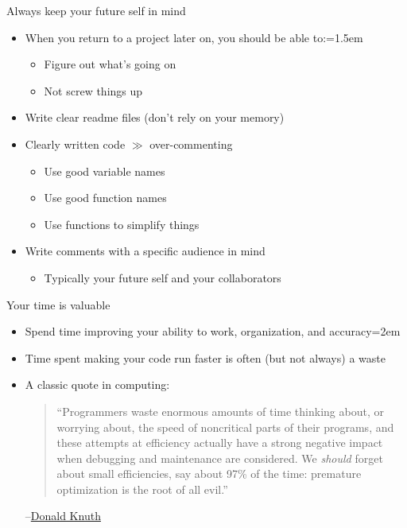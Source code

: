 \documentclass{beamer}
\begin{document}
\begin{frame}{Always keep your future self in mind}
    \begin{itemize}
        \item When you return to a project later on, you should be able to:\itemsep=1.5em
        \begin{itemize}
            \item Figure out what's going on
            \item Not screw things up
        \end{itemize}
        \item Write clear readme files (don't rely on your memory)
        \item Clearly written code $\gg$ over-commenting
        \begin{itemize}
            \item Use good variable names
            \item Use good function names
            \item Use functions to simplify things
        \end{itemize}
        \item Write comments with a specific audience in mind
        \begin{itemize}
            \item Typically your future self and your collaborators
        \end{itemize}
    \end{itemize}
\end{frame}

\begin{frame}{Your time is valuable}
    \begin{itemize}
        \item Spend time improving your ability to work, organization, and accuracy\itemsep=2em
        \item Time spent making your code run faster is often (but not always) a waste
        \item<2> A classic quote in computing: \begin{quote}
    ``Programmers waste enormous amounts of time thinking about, or worrying about, the speed of noncritical parts of their programs, and these attempts at efficiency actually have a  strong negative impact when debugging and maintenance are considered. We \textit{should} forget about small efficiencies, say about 97\% of the time: premature optimization is the root of all evil.''
    \end{quote}
    --\href{https://doi.org/10.1145/356635.356640}{Donald Knuth}
    \end{itemize}
\end{frame}
\end{document}
